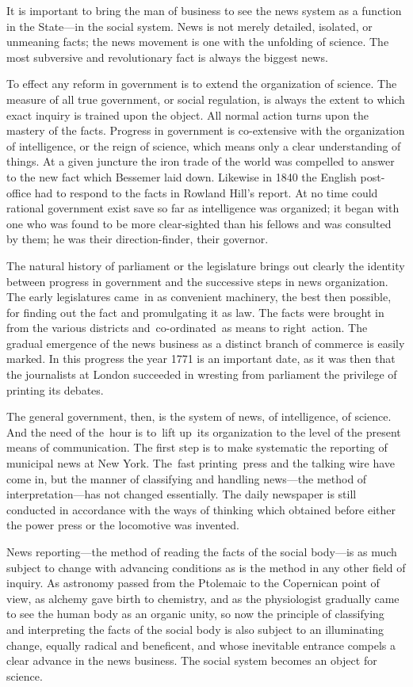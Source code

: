 \documentclass[openany,nobib]{tufte-book}
\begin{document}
It is important to bring the man of business to see the news system as a
function in the State---in the social system. News is not merely
detailed, isolated, or unmeaning facts; the news movement is one with
the unfolding of science. The most subversive and revolutionary fact is
always the biggest news. ~

To effect any reform in government is to extend the organization of
science. The measure of all true government, or social regulation, is
always the extent to which exact inquiry is trained upon the object. All
normal action turns upon the mastery of the facts. Progress in
government is co-extensive with the organization of intelligence, or the
reign of science, which means only a clear understanding of things. At a
given juncture the iron trade of the world was compelled to answer to
the new fact which Bessemer laid down. Likewise in 1840 the English
post-office had to respond to the facts in Rowland Hill's report. At no
time could rational government exist save so far as intelligence was
organized; it began with one who was found to be more clear-sighted than
his fellows and was consulted by them; he was their direction-finder,
their governor. ~

The natural history of parliament or the legislature brings out clearly
the identity between progress in government and the successive steps in
news organization. The early legislatures came~in as convenient
machinery, the best then possible, for finding out the fact and
promulgating it as law. The facts were brought in from the various
districts and~co-ordinated~as means to right~action. The gradual
emergence of the news business as a distinct branch of commerce is
easily marked. In this progress the year 1771 is an important date, as
it was then that the journalists at London succeeded in wresting from
parliament the privilege of printing its debates.~

The general government, then, is the system of news, of intelligence, of
science. And the need of the~hour is to~lift up~its organization to the
level of the present means of communication. The first step is to make
systematic the reporting of municipal news at New York. The~fast
printing~press and the talking wire have come in, but the manner of
classifying and handling news---the method of interpretation---has not
changed essentially. The daily newspaper is still conducted in
accordance with the ways of thinking which obtained before either the
power press or the locomotive was invented.~

News reporting---the method of reading the facts of the social body---is
as much subject to change with advancing conditions as is the method in
any other field of inquiry. As astronomy passed from the Ptolemaic to
the Copernican point of view, as alchemy gave birth to chemistry, and as
the physiologist gradually came to see the human body as an organic
unity, so now the principle of classifying and interpreting the facts of
the social body is also subject to an illuminating change, equally
radical and beneficent, and whose inevitable entrance compels a clear
advance in the news business. The social system becomes an object for
science.~
\end{document}
